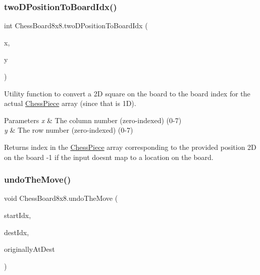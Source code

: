 \subsubsection{\texorpdfstring{two\+D\+Position\+To\+Board\+Idx()}{twoDPositionToBoardIdx()}\hspace{0.1cm}{\footnotesize\ttfamily [2/2]}}
{\footnotesize\ttfamily int Chess\+Board8x8.\+two\+D\+Position\+To\+Board\+Idx (\begin{DoxyParamCaption}\item[{int}]{x,  }\item[{int}]{y }\end{DoxyParamCaption})\hspace{0.3cm}{\ttfamily [protected]}}

Utility function to convert a 2D square on the board to the board index for the actual \mbox{\hyperlink{class_chess_piece}{Chess\+Piece}} array (since that is 1D). 
\begin{DoxyParams}{Parameters}
{\em x} & The column number (zero-\/indexed) (0-\/7) \\
\hline
{\em y} & The row number (zero-\/indexed) (0-\/7) \\
\hline
\end{DoxyParams}
\begin{DoxyReturn}{Returns}
index in the \mbox{\hyperlink{class_chess_piece}{Chess\+Piece}} array corresponding to the provided position 2D on the board -\/1 if the input doesn\textquotesingle{}t map to a location on the board. 
\end{DoxyReturn}
\mbox{\label{class_chess_board8x8_a559ca5493556a5f287b822b53117b7a6}} 
\subsubsection{\texorpdfstring{undo\+The\+Move()}{undoTheMove()}}
{\footnotesize\ttfamily void Chess\+Board8x8.\+undo\+The\+Move (\begin{DoxyParamCaption}\item[{int}]{start\+Idx,  }\item[{int}]{dest\+Idx,  }\item[{\mbox{\hyperlink{class_chess_piece}{Chess\+Piece}}}]{originally\+At\+Dest }\end{DoxyParamCaption})\hspace{0.3cm}{\ttfamily [protected]}}

